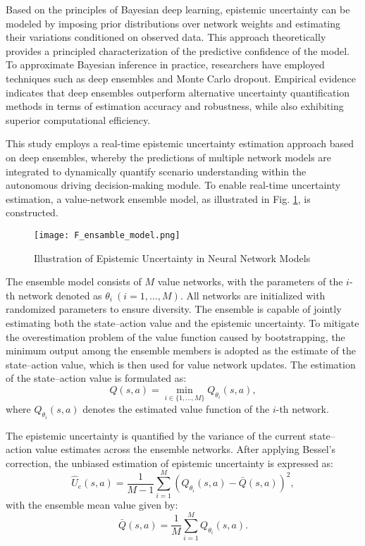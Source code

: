 \documentclass[preprint,12pt,authoryear]{elsarticle}
\begin{document}
Based on the principles of Bayesian deep learning, epistemic uncertainty can be modeled by imposing prior distributions over network weights and estimating their variations conditioned on observed data. This approach theoretically provides a principled characterization of the predictive confidence of the model. To approximate Bayesian inference in practice, researchers have employed techniques such as deep ensembles and Monte Carlo dropout. Empirical evidence indicates that deep ensembles outperform alternative uncertainty quantification methods in terms of estimation accuracy and robustness, while also exhibiting superior computational efficiency.

This study employs a real-time epistemic uncertainty estimation approach based on deep ensembles, whereby the predictions of multiple network models are integrated to dynamically quantify scenario understanding within the autonomous driving decision-making module. To enable real-time uncertainty estimation, a value-network ensemble model, as illustrated in Fig. \ref{F_ensamble_model}, is constructed.

\begin{figure}[hbtp]
\centering
\texttt{[image: F\_ensamble\_model.png]}
\caption{Illustration of Epistemic Uncertainty in Neural Network Models}
\label{F_ensamble_model}
\end{figure}

The ensemble model consists of $M$ value networks, with the parameters of the $i$-th network denoted as $\theta_i \ (i=1,\dots,M)$. All networks are initialized with randomized parameters to ensure diversity. The ensemble is capable of jointly estimating both the state–action value and the epistemic uncertainty. To mitigate the overestimation problem of the value function caused by bootstrapping, the minimum output among the ensemble members is adopted as the estimate of the state–action value, which is then used for value network updates. The estimation of the state–action value is formulated as:
\begin{equation}
Q(s,a) = \min_{i \in \{1,\dots,M\}} Q_{\theta_i}(s,a),
\label{eq4_1}
\end{equation}
where $Q_{\theta_i}(s,a)$ denotes the estimated value function of the $i$-th network.

The epistemic uncertainty is quantified by the variance of the current state–action value estimates across the ensemble networks. After applying Bessel’s correction, the unbiased estimation of epistemic uncertainty is expressed as:
\begin{equation}
\hat{U}_{e}(s,a) = \frac{1}{M-1} \sum_{i=1}^{M} 
\left(Q_{\theta_i}(s,a) - \bar{Q}(s,a)\right)^2,
\label{eq4_2}
\end{equation}
with the ensemble mean value given by:
\begin{equation}
\bar{Q}(s,a) = \frac{1}{M} \sum_{i=1}^{M} Q_{\theta_i}(s,a).
\label{eq4_3}
\end{equation}
\end{document}
